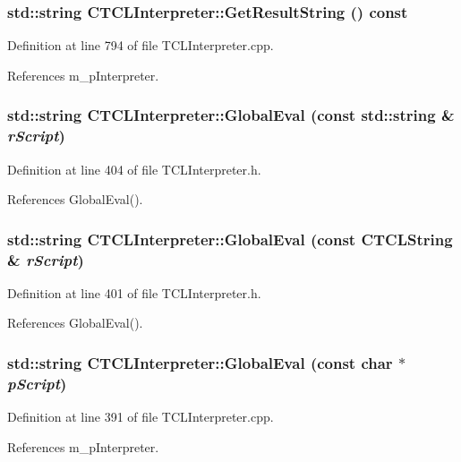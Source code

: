 \subsubsection{\setlength{\rightskip}{0pt plus 5cm}std::string CTCLInterpreter::Get\-Result\-String () const}\label{classCTCLInterpreter_a42}




Definition at line 794 of file TCLInterpreter.cpp.

References m\_\-p\-Interpreter.
\subsubsection{\setlength{\rightskip}{0pt plus 5cm}std::string CTCLInterpreter::Global\-Eval (const std::string \& {\em r\-Script})\hspace{0.3cm}{\tt  [inline]}}\label{classCTCLInterpreter_a13}




Definition at line 404 of file TCLInterpreter.h.

References Global\-Eval().
\subsubsection{\setlength{\rightskip}{0pt plus 5cm}std::string CTCLInterpreter::Global\-Eval (const {\bf CTCLString} \& {\em r\-Script})\hspace{0.3cm}{\tt  [inline]}}\label{classCTCLInterpreter_a12}




Definition at line 401 of file TCLInterpreter.h.

References Global\-Eval().
\subsubsection{\setlength{\rightskip}{0pt plus 5cm}std::string CTCLInterpreter::Global\-Eval (const char $\ast$ {\em p\-Script})}\label{classCTCLInterpreter_a11}




Definition at line 391 of file TCLInterpreter.cpp.

References m\_\-p\-Interpreter.

